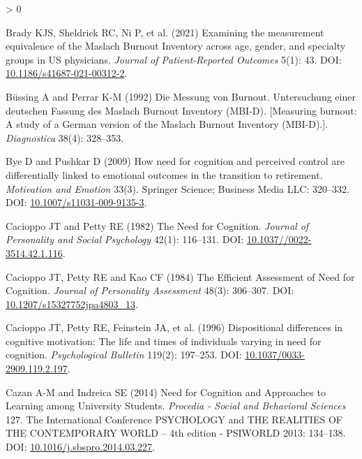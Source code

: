 \documentclass[
  english,
  man,floatsintext]{apa6}
\newlength{\cslhangindent}
\newenvironment{CSLReferences}[2] %
 {%
  \setlength{\parindent}{0pt}
  \ifodd #1 \everypar{\setlength{\hangindent}{\cslhangindent}}\ignorespaces\fi
  \ifnum #2 > 0
  \setlength{\parskip}{#2\baselineskip}
  \fi
 }%
 {}
\begin{document}
\begin{CSLReferences}{1}{0}
\leavevmode\hypertarget{ref-Brady2021}{}%
Brady KJS, Sheldrick RC, Ni P, et al. (2021) Examining the measurement equivalence of the {Maslach} {Burnout} {Inventory} across age, gender, and specialty groups in {US} physicians. \emph{Journal of Patient-Reported Outcomes} 5(1): 43. DOI: \href{https://doi.org/10.1186/s41687-021-00312-2}{10.1186/s41687-021-00312-2}.

\leavevmode\hypertarget{ref-Buessing1992}{}%
Büssing A and Perrar K-M (1992) Die {Messung} von {Burnout}. {Untersuchung} einer deutschen {Fassung} des {Maslach} {Burnout} {Inventory} ({MBI}-{D}). {[}{Measuring} burnout: {A} study of a {German} version of the {Maslach} {Burnout} {Inventory} ({MBI}-{D}).{]}. \emph{Diagnostica} 38(4): 328--353.

\leavevmode\hypertarget{ref-Bye2009}{}%
Bye D and Pushkar D (2009) How need for cognition and perceived control are differentially linked to emotional outcomes in the transition to retirement. \emph{Motivation and Emotion} 33(3). Springer Science; Business Media {LLC}: 320--332. DOI: \href{https://doi.org/10.1007/s11031-009-9135-3}{10.1007/s11031-009-9135-3}.

\leavevmode\hypertarget{ref-Cacioppo1982}{}%
Cacioppo JT and Petty RE (1982) The {Need} for {Cognition}. \emph{Journal of Personality and Social Psychology} 42(1): 116--131. DOI: \href{https://doi.org/10.1037//0022-3514.42.1.116}{10.1037//0022-3514.42.1.116}.

\leavevmode\hypertarget{ref-Cacioppo1984}{}%
Cacioppo JT, Petty RE and Kao CF (1984) The {Efficient} {Assessment} of {Need} for {Cognition}. \emph{Journal of Personality Assessment} 48(3): 306--307. DOI: \href{https://doi.org/10.1207/s15327752jpa4803_13}{10.1207/s15327752jpa4803\_13}.

\leavevmode\hypertarget{ref-Cacioppo1996}{}%
Cacioppo JT, Petty RE, Feinstein JA, et al. (1996) Dispositional differences in cognitive motivation: {The} life and times of individuals varying in need for cognition. \emph{Psychological Bulletin} 119(2): 197--253. DOI: \href{https://doi.org/10.1037/0033-2909.119.2.197}{10.1037/0033-2909.119.2.197}.

\leavevmode\hypertarget{ref-Cazan2014}{}%
Cazan A-M and Indreica SE (2014) Need for {Cognition} and {Approaches} to {Learning} among {University} {Students}. \emph{Procedia - Social and Behavioral Sciences} 127. The {International} {Conference} {PSYCHOLOGY} {and} {THE} {REALITIES} {OF} {THE} {CONTEMPORARY} {WORLD} -- 4th {edition} - {PSIWORLD} 2013: 134--138. DOI: \href{https://doi.org/10.1016/j.sbspro.2014.03.227}{10.1016/j.sbspro.2014.03.227}.


\end{CSLReferences}
\end{document}
